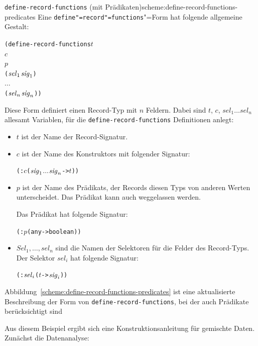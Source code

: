 \begin{feature}{\texttt{define-record-functions} (mit Prädikaten)}{scheme:define-record-functions-predicates}
Eine \texttt{define"=record"=functions}"=Form
hat folgende allgemeine Gestalt:
%
\begin{alltt}
(define-record-functions \(t\)
  \(c\)
  \(p\)
  (\(\mathit{sel}\sb{1}\) \(\mathit{sig}\sb{1}\))
  \(\ldots\)
  (\(\mathit{sel}\sb{n}\) \(\mathit{sig}\sb{n}\)))
\end{alltt}
%
Diese Form definiert einen Record-Typ mit $n$ Feldern.
Dabei sind $t$, $c$, $\mathit{sel}_1 \ldots \mathit{sel}_n$ allesamt Variablen, für die
\texttt{define-record-functions} Definitionen anlegt:
%
\begin{itemize}
\item $t$ ist der Name der Record-Signatur.
\item $c$ ist der Name des Konstruktors mit 
  folgender Signatur:
%  
\begin{alltt}
(: \(c\) (\(\mathit{sig}\sb{1}\) \(\ldots\) \(\mathit{sig}\sb{n}\) -> \(t\)))
\end{alltt}
\item $p$ ist der Name des Prädikats, der Records diesen Typs von
  anderen Werten unterscheidet.  Das Prädikat kann auch weggelassen
  werden.

    Das Prädikat hat folgende Signatur:
\begin{alltt}
(: \(p\) (any -> boolean))
\end{alltt}
\item $\mathit{Sel}_1, \ldots, \mathit{sel}_n$ sind die Namen der Selektoren für die Felder
  des Record-Typs.  Der Selektor $\mathit{sel}_i$ hat folgende Signatur:
% 
\begin{alltt}
(: \(\mathit{sel}\sb{i}\) (\(t\) -> \(\mathit{sig}\sb{i}\)))
\end{alltt}
\end{itemize}
%
\end{feature}
%
Abbildung~\ref{scheme:define-record-functions-predicates} ist eine
aktualisierte Beschreibung der Form von
\texttt{define-record-functions}, bei der auch Prädikate
berücksichtigt sind

Aus diesem Beispiel ergibt sich eine Konstruktionsanleitung für
gemischte Daten.  Zunächst die Datenanalyse:

